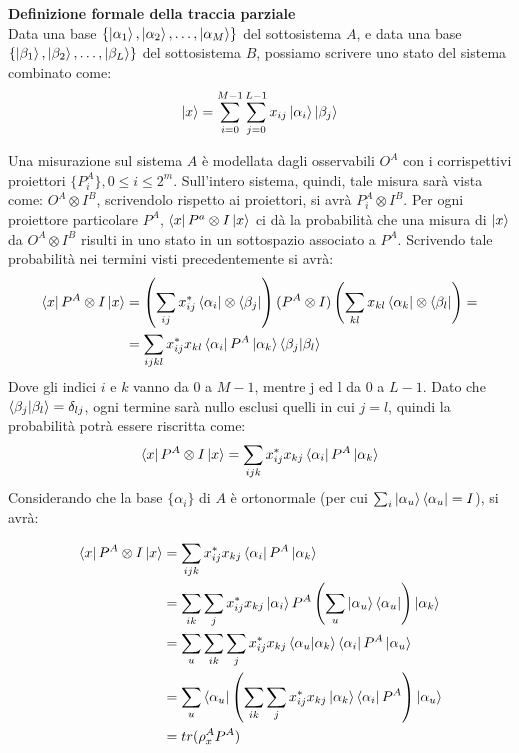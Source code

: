 \begin{info}
\textbf{Definizione formale della traccia parziale}\\
Data una base \(\{\ket{\alpha_1}, \ket{\alpha_2}, \dots, \ket{\alpha_M}\}\) del sottosistema \(A\), e data una base \(\{\ket{\beta_1}, \ket{\beta_2}, \dots, \ket{\beta_L}\}\) del sottosistema \(B\), possiamo scrivere uno stato del sistema combinato come:
\begin{gather*}
\ket{x}=\sum_{i=0}^{M-1}\sum_{j=0}^{L-1}x_{ij}\ket{\alpha_i}\ket{\beta_j}
\end{gather*}

Una misurazione sul sistema \(A\) è modellata dagli osservabili \(O^A\) con i corrispettivi proiettori \(\{P_i^A\}, 0 \le i \le 2^m\). Sull'intero sistema, quindi, tale misura sarà vista come: \(O^A \otimes I^B\), scrivendolo rispetto ai proiettori, si avrà \(P_i^A \otimes I^B\). Per ogni proiettore particolare \(P^A\), \(\bra{x}P^a \otimes I \ket{x}\) ci dà la probabilità che una misura di \(\ket{x}\) da \(O^A \otimes I^B\) risulti in uno stato in un sottospazio associato a \(P^A\). Scrivendo tale probabilità nei termini visti precedentemente si avrà:
\begin{align*}
\bra{x} P^A \otimes I \ket{x} &= \left(\sum_{ij}x_{ij}^*\bra{\alpha_i}\otimes\bra{\beta_j}\right)(P^A \otimes I)\left(\sum_{kl}x_{kl}\bra{\alpha_k}\otimes\bra{\beta_l}\right)=\\
&= \sum_{ijkl}x_{ij}^* x_{kl}\bra{\alpha_i}P^A\ket{\alpha_k}\braket{\beta_j | \beta_l}
\end{align*}
Dove gli indici \(i\) e \(k\) vanno da 0 a \(M-1\), mentre j ed l da 0 a \(L-1\). Dato che \(\braket{\beta_j | \beta_l} = \delta_{lj}\), ogni termine sarà nullo esclusi quelli in cui \(j=l\), quindi la probabilità potrà essere riscritta come:
\begin{align*}
\bra{x} P^A \otimes I\ket{x}=\sum_{ijk}x_{ij}^*x_{kj}\bra{\alpha_i}P^A\ket{\alpha_k}
\end{align*}
Considerando che la base \(\{\alpha_i\}\) di \(A\) è ortonormale (per cui \(\sum_i\ket{\alpha_u}\bra{\alpha_u}=I\)), si avrà:

\begin{align*}
\bra{x} P^A \otimes I\ket{x}&=\sum_{ijk}x_{ij}^*x_{kj}\bra{\alpha_i}P^A\ket{\alpha_k}\\
&=\sum_{ik}\sum_j x_{ij}^* x_{kj} \ket{\alpha_i} P^A \left(\sum_u \ket{\alpha_u}\bra{\alpha_u}\right)\ket{\alpha_k}\\
&=\sum_u\sum_{ik}\sum_j x_{ij}^*x_{kj}\braket{\alpha_u | \alpha_k}\bra{\alpha_i}P^A\ket{\alpha_u}\\
&=\sum_u \bra{\alpha_u}\left(\sum_{ik}\sum_j x_{ij}^*x_{kj}\ket{\alpha_k}\bra{\alpha_i}P^A\right)\ket{\alpha_u}\\
&=tr(\rho_x^A P^A)
\end{align*}


\end{info}
